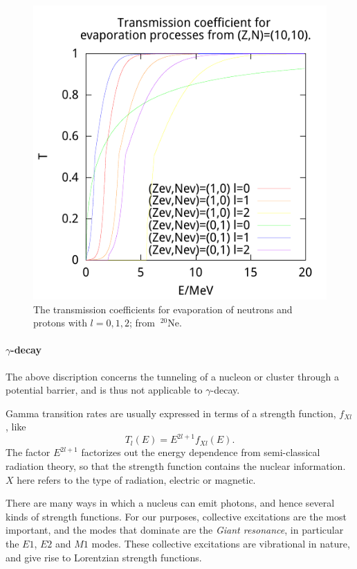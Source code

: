 \begin{figure}
\begin{center}
\includegraphics{figures/pot/np-transZ10N10.pdf}
\caption{\label{fig:np-tZ10N10} The transmission coefficients for evaporation of neutrons and protons with $l=0, 1, 2$; from $~^{20}\mathrm{Ne}$. }
\end{center}
\end{figure}

\clearpage
\paragraph{$\gamma$-decay}
The above discription concerns the tunneling of a nucleon or cluster through a potential barrier, and is thus not applicable to $\gamma$-decay.

Gamma transition rates are usually expressed in terms of a strength function, $f_{Xl}$, like
\begin{equation}
T_l(E) = E^{2l+1} f_{Xl}(E).\label{eq:gammat}
\end{equation}
The factor $E^{2l+1}$ factorizes out the energy dependence from semi-classical radiation theory, so that the strength function contains the nuclear information. $X$ here refers to the type of radiation, electric or magnetic.

There are many ways in which a nucleus can emit photons, and hence several kinds of strength functions.  For our purposes, collective excitations are the most important, and the modes that dominate are the \emph{Giant resonance}, in particular the $E1$, $E2$ and $M1$ modes\cite{ripl:2006}. These collective excitations are vibrational in nature, and give rise to Lorentzian strength functions.

